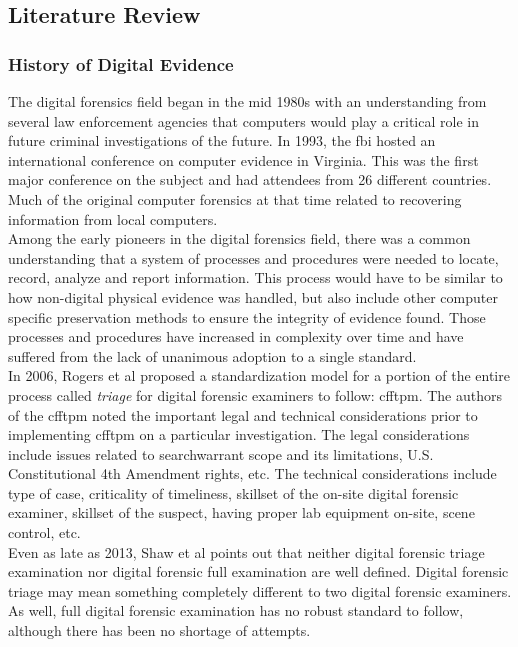\documentclass[12pt]{article}
\begin{document}
\subsection{Literature Review}
\subsubsection{History of Digital Evidence}

The digital forensics field began in the mid 1980s with an understanding from several law enforcement
agencies that computers would play a critical role in future criminal investigations of the future.
In 1993, the \gls{fbi} hosted an international conference on computer evidence in Virginia.  This was
the first major conference on the subject and had attendees from 26 different countries.  Much
of the original computer
forensics at that time related to recovering information from local computers.\\

Among the early pioneers in the digital forensics field, there was a common understanding that a
system of processes and procedures were needed to locate, record, analyze and report information.
This process would have to be similar to how non-digital physical evidence was handled, but also
include other computer specific preservation methods to ensure the integrity of evidence found.
Those processes and procedures have increased in complexity over time and have suffered from the
lack of unanimous adoption to a single standard.\\

In 2006, Rogers et al\cite{rogers2006computer} proposed a standardization model for a portion
of the entire process called {\em triage} for digital
forensic examiners to follow: \gls{cfftpm}.
The authors of the \gls{cfftpm} noted the important legal and technical
considerations prior to implementing \gls{cfftpm} on a particular investigation.  The legal
considerations include issues
related to \gls{searchwarrant} scope and its limitations, U.S. Constitutional 4th Amendment rights, etc.
The technical 
considerations include type of case, criticality of timeliness, skillset of the on-site
digital forensic examiner, 
skillset of the suspect, having proper lab equipment on-site, scene control, etc.\\

Even as late as 2013, Shaw et al\cite{shaw2013practical} points out that neither digital forensic
triage examination nor digital forensic full examination are well defined.
Digital forensic triage may mean something completely different to two digital forensic
examiners.  As well, full digital forensic examination has no robust standard to follow, although
there has been no shortage of attempts.\\
\end{document}

